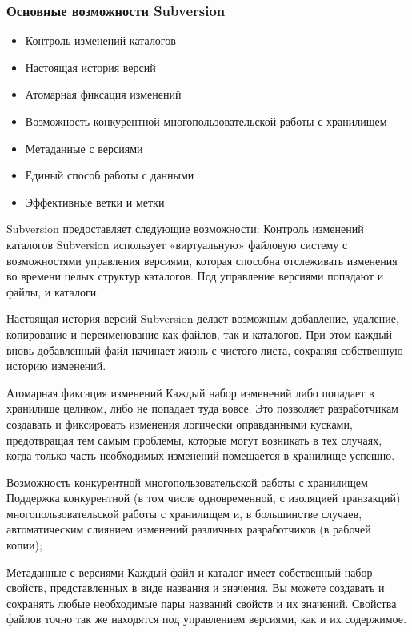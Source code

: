 \documentclass{../industrial-development}
\begin{document}
\begin{frame} \frametitle{Основные возможности Subversion}
  
  \begin{itemize}
  \item Контроль изменений каталогов
  \item Настоящая история версий
  \item Атомарная фиксация изменений
  \item Возможность конкурентной многопользовательской работы с хранилищем
  \item Метаданные с версиями
  \item Единый способ работы с данными
  \item Эффективные ветки и метки
  \end{itemize}
\end{frame}

\lecturenotes

Subversion предоставляет следующие возможности:
Контроль изменений каталогов 
Subversion использует «виртуальную» файловую систему с возможностями управления версиями, которая способна отслеживать изменения во времени целых структур каталогов. Под управление версиями попадают и файлы, и каталоги.

Настоящая история версий 
Subversion делает возможным добавление, удаление, копирование и переименование как файлов, так и каталогов. При этом каждый вновь добавленный файл начинает жизнь с чистого листа, сохраняя собственную историю изменений.

Атомарная фиксация изменений 
Каждый набор изменений либо попадает в хранилище целиком, либо не попадает туда вовсе. Это позволяет разработчикам создавать и фиксировать изменения логически оправданными кусками, предотвращая тем самым проблемы, которые могут возникать в тех случаях, когда только часть необходимых изменений помещается в хранилище успешно.

Возможность конкурентной многопользовательской работы с хранилищем
Поддержка конкурентной (в том числе одновременной, с изоляцией транзакций) многопользовательской работы с хранилищем и, в большинстве случаев, автоматическим слиянием изменений различных разработчиков (в рабочей копии);

Метаданные с версиями 
Каждый файл и каталог имеет собственный набор свойств, представленных в виде названия и значения. Вы можете создавать и сохранять любые необходимые пары названий свойств и их значений. Свойства файлов точно так же находятся под управлением версиями, как и их содержимое.
\end{document}
